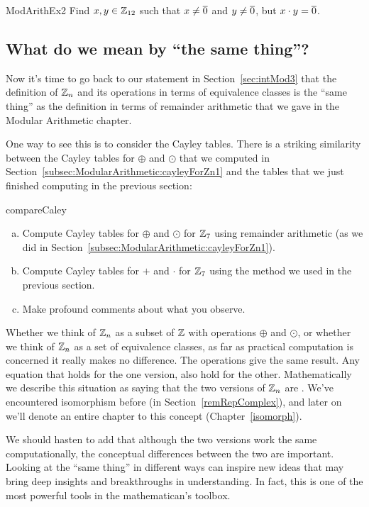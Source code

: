 \begin{exercise}{ModArithEx2}  
Find $x,y \in \mathbb{Z}_{12}$ such that $x \neq \overline{0}$ and $y \neq \overline{0}$, but $x \cdot y = \overline{0}$.
\end{exercise}

\subsection{What do we mean by ``the same thing''?}\label{sec:theSameThing}
Now it's time to go back to our statement in Section~\ref{sec:intMod3} that the definition of $\mathbb{Z}_n$ and its operations in terms of equivalence classes is the ``same thing'' as the definition in terms of remainder arithmetic that we gave in the Modular Arithmetic chapter.

One way to see this is to consider the Cayley tables. There is a striking similarity between the Cayley tables for $\oplus$ and $\odot$ that we computed in Section~\ref{subsec:ModularArithmetic:cayleyForZn1} and the tables that we just finished computing in the previous section:

\begin{exercise}{compareCaley}
\begin{enumerate}[(a)]
\item
Compute Cayley tables for $\oplus$ and $\odot$ for $\mathbb{Z}_7$ using remainder arithmetic (as we did in Section~\ref{subsec:ModularArithmetic:cayleyForZn1}).
\item
Compute Cayley tables for $+$ and $\cdot$ for $\mathbb{Z}_7$ using the method we used in the previous section.
\item
Make profound comments about what you observe.
\end{enumerate}
\end{exercise}

Whether we think of $\mathbb{Z}_n$ as a subset of $\mathbb{Z}$ with operations $\oplus$ and $\odot$, or whether we think of $\mathbb{Z}_n$ as a set of equivalence classes, as far as practical computation is concerned it really makes no difference. The operations give the same result. Any equation that holds for the one version, also hold for the other. Mathematically we describe this situation as saying that the two versions of $\mathbb{Z}_n$ are . We've encountered isomorphism before (in Section~\ref{remRepComplex}), and later on we'll denote an entire chapter to this concept (Chapter~\ref{isomorph}).

We should hasten to add that although the two versions work the same computationally, the conceptual differences between the two are important. Looking at the ``same thing'' in different ways can inspire new ideas that may bring deep insights and breakthroughs in understanding.  In fact, this is one of the most powerful tools in the mathematican's toolbox. 

